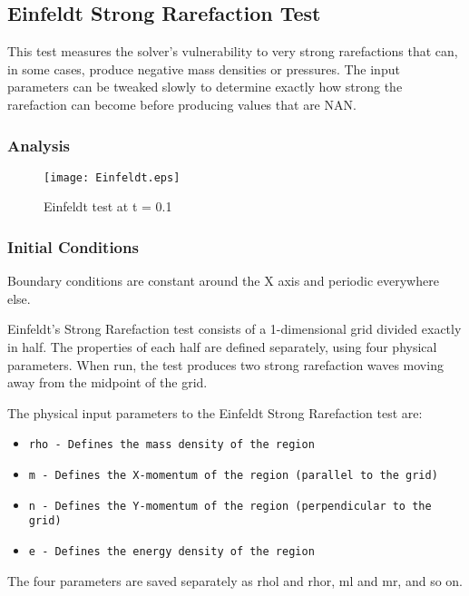 

\subsection{Einfeldt Strong Rarefaction Test}

This test measures the solver's vulnerability to very strong rarefactions that can, in some cases, 
produce negative mass densities or pressures. The input parameters can be tweaked slowly to determine 
exactly how strong the rarefaction can become before producing values that are NAN. 

\subsubsection{Analysis}

\begin{figure*}
\begin{center}
\texttt{[image: Einfeldt.eps]}
\caption{Einfeldt test at t = 0.1}
\end{center}
\end{figure*}
\subsubsection{Initial Conditions}

Boundary conditions are constant around the X axis and periodic everywhere else.

Einfeldt's Strong Rarefaction test consists of a 1-dimensional grid divided exactly in half. The 
properties of each half are defined separately, using four physical parameters. When run, the test 
produces two strong rarefaction waves moving away from the midpoint of the grid.

The physical input parameters to the Einfeldt Strong Rarefaction test are:
\begin{itemize}
\item \tt{rho} - Defines the mass density of the region
\item \tt{m} - Defines the X-momentum of the region (parallel to the grid)
\item \tt{n} - Defines the Y-momentum of the region (perpendicular to the grid)
\item \tt{e} - Defines the energy density of the region
\end{itemize}

The four parameters are saved separately as rhol and rhor, ml and mr, and so on.
